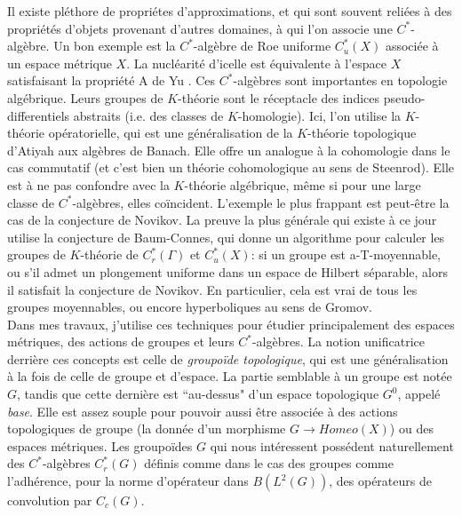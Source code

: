 \documentclass[a4paper,11pt]{article}
\begin{document}
Il existe pl\'ethore de propri\'etes d'approximations, et qui sont souvent reli\'ees \`a des propri\'et\'es d'objets provenant d'autres domaines, \`a qui l'on associe une $C^*$-alg\`ebre. Un bon exemple est la $C^*$-alg\`ebre de Roe uniforme $C^*_u(X)$ associ\'ee \`a un espace m\'etrique $X$. La nucl\'earit\'e d'icelle est \'equivalente \`a l'espace $X$ satisfaisant la propri\'et\'e A de Yu \cite{nowak2008property}. Ces $C^*$-alg\`ebres sont importantes en topologie alg\'ebrique. Leurs groupes de $K$-th\'eorie sont le r\'eceptacle des indices pseudo-differentiels abstraits (i.e. des classes de $K$-homologie). Ici, l'on utilise la $K$-th\'eorie op\'eratorielle, qui est une g\'en\'eralisation de la $K$-th\'eorie topologique d'Atiyah aux alg\`ebres de Banach. Elle offre un analogue \`a la cohomologie dans le cas commutatif (et c'est bien un th\'eorie cohomologique au sens de Steenrod). Elle est \`a ne pas confondre avec la $K$-th\'eorie alg\'ebrique, m\^eme si pour une large classe de $C^*$-alg\`ebres, elles co\"incident. L'exemple le plus frappant est peut-\^etre la cas de la conjecture de Novikov. La preuve la plus g\'en\'erale qui existe \`a ce jour utilise la conjecture de Baum-Connes, qui donne un algorithme pour calculer les groupes de $K$-th\'eorie de $C^*_r(\Gamma)$ et $C_u^*(X)$: si un groupe est a-T-moyennable, ou s'il admet un plongement uniforme dans un espace de Hilbert s\'eparable, alors il satisfait la conjecture de Novikov. En particulier, cela est vrai de tous les groupes moyennables, ou encore hyperboliques au sens de Gromov.\\

Dans mes travaux, j'utilise ces techniques pour \'etudier principalement des espaces m\'etriques, des actions de groupes et leurs $C^*$-alg\`ebres. La notion unificatrice derri\`ere ces concepts est celle de \textit{groupo\"ide topologique}, qui est une g\'en\'eralisation \`a la fois de celle de groupe et d'espace. La partie semblable \`a un groupe est not\'ee $G$, tandis que cette derni\`ere est ``au-dessus" d'un espace topologique $G^0$, appel\'e \textit{base}. Elle est assez souple pour pouvoir aussi \^etre associ\'ee \`a des actions topologiques de groupe (la donn\'ee d'un morphisme $G\rightarrow Homeo(X)$) ou des espaces m\'etriques. Les groupo\"ides $G$ qui nous int\'eressent poss\'edent naturellement des $C^*$-alg\`ebres $C_r^*(G)$ d\'efinis comme dans le cas des groupes comme l'adh\'erence, pour la norme d'op\'erateur dans $B(L^2(G))$, des op\'erateurs de convolution par $C_c(G)$.

\end{document}
